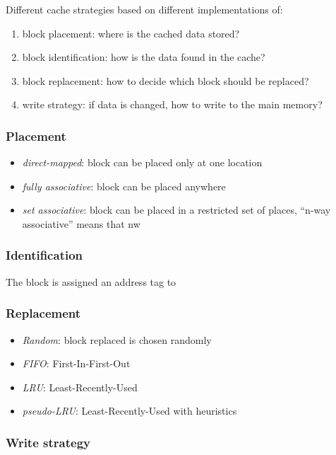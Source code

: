 \documentclass{article}
\begin{document}
\medskip
Different cache strategies based on different implementations of:
\begin{enumerate}
\item block placement: where is the cached data stored?
\item block identification: how is the data found in the cache?
\item block replacement: how to decide which block should be replaced?
\item write strategy: if data is changed, how to write to the main memory?
\end{enumerate}

\subsubsection{Placement}
\begin{itemize}
\item \textit{direct-mapped}: block can be placed only at one location
\item \textit{fully associative}: block can be placed anywhere
\item \textit{set associative}: block can be placed in a restricted set of places, ``n-way associative'' means that nw
\end{itemize}

\subsubsection{Identification}

The block is assigned an address tag to 

\subsubsection{Replacement}

\begin{itemize}
\item \textit{Random}: block replaced is chosen randomly
\item \textit{FIFO}: First-In-First-Out
\item \textit{LRU}: Least-Recently-Used
\item \textit{pseudo-LRU}: Least-Recently-Used with heuristics
\end{itemize}

\subsubsection{Write strategy}
\end{document}
